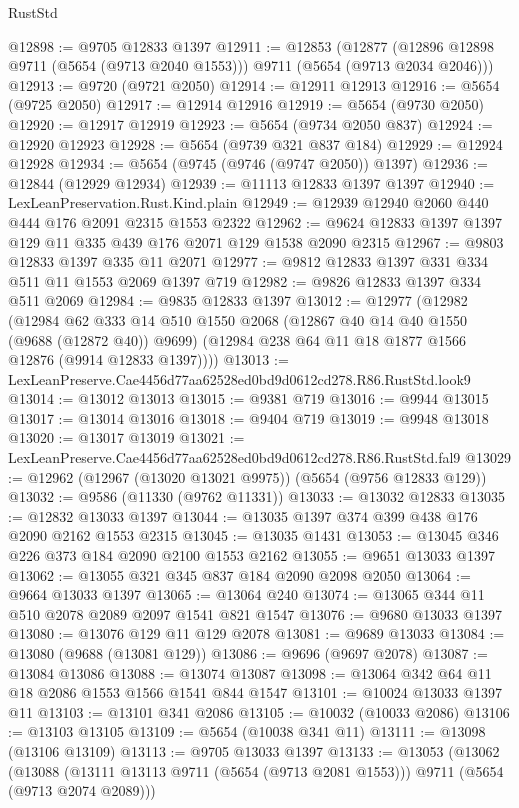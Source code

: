 \begin{lexlean}{RustStd}
\begin{coremodule}
@12898 := @9705 @12833 @1397
@12911 := @12853
    (@12877 (@12896 @12898 @9711 (@5654 (@9713 @2040 @1553))) @9711 (@5654 (@9713 @2034 @2046)))
@12913 := @9720 (@9721 @2050)
@12914 := @12911 @12913
@12916 := @5654 (@9725 @2050)
@12917 := @12914 @12916
@12919 := @5654 (@9730 @2050)
@12920 := @12917 @12919
@12923 := @5654 (@9734 @2050 @837)
@12924 := @12920 @12923
@12928 := @5654 (@9739 @321 @837 @184)
@12929 := @12924 @12928
@12934 := @5654 (@9745 (@9746 (@9747 @2050)) @1397)
@12936 := @12844 (@12929 @12934)
@12939 := @11113 @12833 @1397 @1397
@12940 := LexLeanPreservation.Rust.Kind.plain
@12949 := @12939 @12940 @2060 @440 @444 @176 @2091 @2315 @1553 @2322
@12962 := @9624 @12833 @1397 @1397 @129 @11 @335 @439 @176 @2071 @129 @1538 @2090 @2315
@12967 := @9803 @12833 @1397 @335 @11 @2071
@12977 := @9812 @12833 @1397 @331 @334 @511 @11 @1553 @2069 @1397 @719
@12982 := @9826 @12833 @1397 @334 @511 @2069
@12984 := @9835 @12833 @1397
@13012 := @12977
    (@12982
      (@12984
        @62
        @333
        @14
        @510
        @1550
        @2068
        (@12867 @40 @14 @40 @1550 (@9688 (@12872 @40)) @9699)
        (@12984 @238 @64 @11 @18 @1877 @1566 @12876 (@9914 @12833 @1397))))
@13013 := LexLeanPreserve.Cae4456d77aa62528ed0bd9d0612cd278.R86.RustStd.look9
@13014 := @13012 @13013
@13015 := @9381 @719
@13016 := @9944 @13015
@13017 := @13014 @13016
@13018 := @9404 @719
@13019 := @9948 @13018
@13020 := @13017 @13019
@13021 := LexLeanPreserve.Cae4456d77aa62528ed0bd9d0612cd278.R86.RustStd.fal9
@13029 := @12962 (@12967 (@13020 @13021 @9975)) (@5654 (@9756 @12833 @129))
@13032 := @9586 (@11330 (@9762 @11331))
@13033 := @13032 @12833
@13035 := @12832 @13033 @1397
@13044 := @13035 @1397 @374 @399 @438 @176 @2090 @2162 @1553 @2315
@13045 := @13035 @1431
@13053 := @13045 @346 @226 @373 @184 @2090 @2100 @1553 @2162
@13055 := @9651 @13033 @1397
@13062 := @13055 @321 @345 @837 @184 @2090 @2098 @2050
@13064 := @9664 @13033 @1397
@13065 := @13064 @240
@13074 := @13065 @344 @11 @510 @2078 @2089 @2097 @1541 @821 @1547
@13076 := @9680 @13033 @1397
@13080 := @13076 @129 @11 @129 @2078
@13081 := @9689 @13033
@13084 := @13080 (@9688 (@13081 @129))
@13086 := @9696 (@9697 @2078)
@13087 := @13084 @13086
@13088 := @13074 @13087
@13098 := @13064 @342 @64 @11 @18 @2086 @1553 @1566 @1541 @844 @1547
@13101 := @10024 @13033 @1397 @11
@13103 := @13101 @341 @2086
@13105 := @10032 (@10033 @2086)
@13106 := @13103 @13105
@13109 := @5654 (@10038 @341 @11)
@13111 := @13098 (@13106 @13109)
@13113 := @9705 @13033 @1397
@13133 := @13053
    (@13062
      (@13088 (@13111 @13113 @9711 (@5654 (@9713 @2081 @1553))) @9711 (@5654 (@9713 @2074 @2089)))

\end{coremodule}
\end{lexlean}
